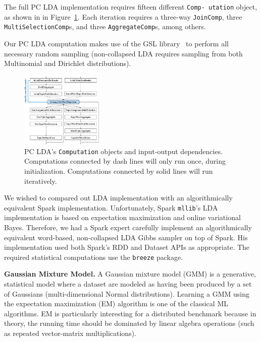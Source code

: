 The full PC LDA implementation requires fifteen different
\texttt{Comp- utation} object, as shown in 
in Figure~\ref{fig:lda-query-graph}.  Each iteration requires a 
three-way \texttt{JoinComp}, three \texttt{MultiSelectionComp}s, and three
\texttt{AggregateComp}s, among others. 

Our PC LDA computation makes use of the GSL library~\cite{gsl} to perform all necessary random sampling (non-collapsed LDA requires 
sampling from both Multinomial and Dirichlet distributions).

\begin{figure}
\centering
\includegraphics[width=0.35\textwidth]{lda-query-graph.pdf}
  \caption{\label{fig:lda-query-graph} PC LDA's \texttt{Computation} objects and input-output dependencies. Computations
    connected by dash lines will only run once, during  
    initialization. Computations connected by solid lines will run iteratively.}
\end{figure}

We wished to compared out LDA implementation with an algorithmically equivalent Spark implementation.  Unfortunately,
Spark \texttt{mllib}'s LDA implementation is based on expectation
maximization and online variational Bayes.
Therefore, we had a Spark expert 
carefully implement an algorithmically
equivalent word-based, non-collapsed LDA Gibbs sampler on top of Spark.  His implementation used both
Spark's RDD and Dataset        
APIs as appropriate.
The required statistical computations use the
\texttt{breeze} package. 


\vspace{5pt}
\noindent
\textbf{Gaussian Mixture Model.} A Gaussian mixture model (GMM) is a generative, statistical model where a dataset are modeled
as having been produced by a set of Gaussians (multi-dimensional Normal distributions). Learning a GMM using
the expectation maximization (EM) algorithm is one of the classical ML algorithms.
EM is particularly interesting for a distributed benchmark because in theory, the running time should be dominated
by linear algebra operations (such as repeated vector-matrix multiplications).

